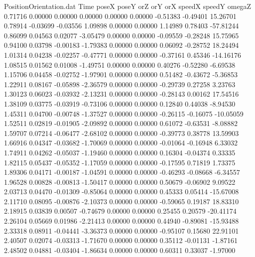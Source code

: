 \begin{filecontents}{PositionOrientation.dat}
Time poseX poseY orZ orY orX speedX speedY omegaZ
   0.71716    0.00000    0.00000     0.00000    0.00000    0.00000   -0.51383   -0.49401   15.26701
   0.78914   -0.03699   -0.03556     1.09898    0.00000    0.00000    1.14989    0.78403  -57.81244
   0.86099    0.04563    0.02077    -3.05479    0.00000    0.00000   -0.09559   -0.28248   15.75965
   0.94100    0.03798   -0.00183    -1.79383    0.00000    0.00000    0.06092   -0.28752   18.24494
   1.01314    0.04238   -0.02257    -0.47771    0.00000    0.00000   -0.37161    0.45346  -14.16176
   1.08515    0.01562    0.01008    -1.49751    0.00000    0.00000    0.40276   -0.52280   -6.69538
   1.15706    0.04458   -0.02752    -1.97901    0.00000    0.00000    0.51482   -0.43672   -5.36853
   1.22911    0.08167   -0.05898    -2.36579    0.00000    0.00000   -0.29739    0.27258    3.23763
   1.30123    0.06023   -0.03932    -2.13231    0.00000    0.00000   -0.28143    0.00162   17.54516
   1.38109    0.03775   -0.03919    -0.73106    0.00000    0.00000    0.12840    0.44038   -8.94530
   1.45311    0.04700   -0.00748    -1.37527    0.00000    0.00000   -0.26115   -0.16075  -10.05059
   1.52511    0.02819   -0.01905    -2.09892    0.00000    0.00000    0.61072   -0.63531   -8.08882
   1.59707    0.07214   -0.06477    -2.68102    0.00000    0.00000   -0.39773    0.38778   13.59903
   1.66916    0.04347   -0.03682    -1.70069    0.00000    0.00000   -0.01064   -0.16948    6.33032
   1.74911    0.04262   -0.05037    -1.19460    0.00000    0.00000    0.16304   -0.04374    0.33335
   1.82115    0.05437   -0.05352    -1.17059    0.00000    0.00000   -0.17595    0.71819    1.73375
   1.89306    0.04171   -0.00187    -1.04591    0.00000    0.00000   -0.46293   -0.08668   -6.34557
   1.96528    0.00828   -0.00813    -1.50417    0.00000    0.00000    0.50679   -0.06902    9.09522
   2.03713    0.04470   -0.01309    -0.85064    0.00000    0.00000    0.45333    0.05414  -15.67008
   2.11710    0.08095   -0.00876    -2.10373    0.00000    0.00000   -0.59065    0.19187   18.83310
   2.18915    0.03839    0.00507    -0.74679    0.00000    0.00000    0.25455    0.20579  -20.41174
   2.26104    0.05669    0.01986    -2.21413    0.00000    0.00000    0.44940   -0.89081  -15.93488
   2.33318    0.08911   -0.04441    -3.36373    0.00000    0.00000   -0.95107    0.15680   22.91101
   2.40507    0.02074   -0.03313    -1.71670    0.00000    0.00000    0.35112   -0.01131   -1.87161
   2.48502    0.04881   -0.03404    -1.86634    0.00000    0.00000    0.60311    0.33037   -1.97000

\end{filecontents}
